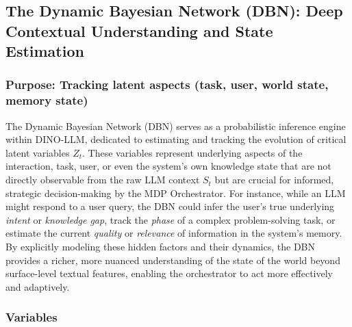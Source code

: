 \documentclass[11pt]{article}
\begin{document}
\subsection{The Dynamic Bayesian Network (DBN): Deep Contextual Understanding and State Estimation}
\label{ssec:dbn}

\subsubsection{Purpose: Tracking latent aspects (task, user, world state, memory state)}
\label{sssec:dbn_purpose}
The Dynamic Bayesian Network (DBN) serves as a probabilistic inference engine within DINO-LLM, dedicated to estimating and tracking the evolution of critical latent variables $Z_t$. These variables represent underlying aspects of the interaction, task, user, or even the system's own knowledge state that are not directly observable from the raw LLM context $S_t$ but are crucial for informed, strategic decision-making by the MDP Orchestrator. For instance, while an LLM might respond to a user query, the DBN could infer the user's true underlying \textit{intent} or \textit{knowledge gap}, track the \textit{phase} of a complex problem-solving task, or estimate the current \textit{quality} or \textit{relevance} of information in the system's memory. By explicitly modeling these hidden factors and their dynamics, the DBN provides a richer, more nuanced understanding of the state of the world beyond surface-level textual features, enabling the orchestrator to act more effectively and adaptively.

\subsubsection{Variables}
\label{sssec:dbn_variables}
\end{document}
